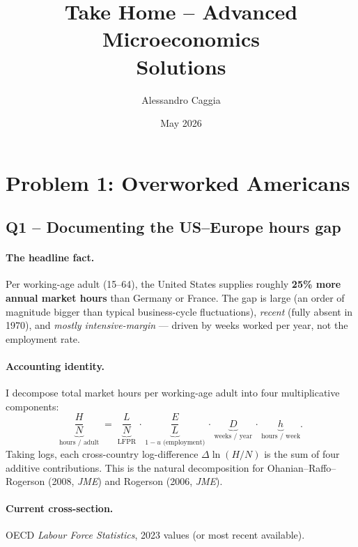 \documentclass[11pt,a4paper]{article}
\title{Take Home -- Advanced Microeconomics\\[0.25em]\large Solutions}
\author{Alessandro Caggia}
\date{May 2026}
\begin{document}
\maketitle

\section*{Problem 1: Overworked Americans}

\subsection*{Q1 -- Documenting the US--Europe hours gap}

\paragraph{The headline fact.}
Per working-age adult (15--64), the United States supplies roughly \textbf{25\% more annual market hours} than Germany or France. The gap is large (an order of magnitude bigger than typical business-cycle fluctuations), \emph{recent} (fully absent in 1970), and \emph{mostly intensive-margin} --- driven by weeks worked per year, not the employment rate.

\paragraph{Accounting identity.}
I decompose total market hours per working-age adult into four multiplicative components:
\begin{equation}
\underbrace{\frac{H}{N}}_{\text{hours / adult}}
\;=\;\underbrace{\frac{L}{N}}_{\text{LFPR}}\,\cdot\,
\underbrace{\frac{E}{L}}_{1-u\text{ (employment)}}\,\cdot\,
\underbrace{D}_{\text{weeks / year}}\,\cdot\,
\underbrace{h}_{\text{hours / week}}.
\label{eq:decomp}
\end{equation}
Taking logs, each cross-country log-difference $\Delta\ln(H/N)$ is the sum of four additive contributions. This is the natural decomposition for Ohanian--Raffo--Rogerson (2008, \emph{JME}) and Rogerson (2006, \emph{JME}).

\paragraph{Current cross-section.}
OECD \emph{Labour Force Statistics}, 2023 values (or most recent available).
\end{document}

